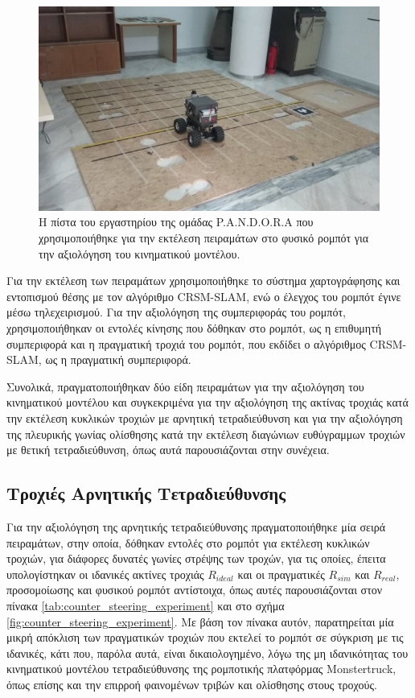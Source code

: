 \begin{figure}[!ht]
	\centering
	\includegraphics[width=\linewidth]{Chapters/Chapter5/Figures/pandora_arena.jpg}
	\caption{Η πίστα του εργαστηρίου της ομάδας P.A.N.D.O.R.A που χρησιμοποιήθηκε για την εκτέλεση πειραμάτων στο φυσικό ρομπότ για την αξιολόγηση του κινηματικού μοντέλου.}
	\label{fig:pandora_circuit}
\end{figure}

\bigskip
Για την εκτέλεση των πειραμάτων χρησιμοποιήθηκε το σύστημα χαρτογράφησης και εντοπισμού θέσης με τον αλγόριθμο CRSM-SLAM, ενώ ο έλεγχος του ρομπότ έγινε μέσω τηλεχειρισμού. Για την αξιολόγηση της συμπεριφοράς του ρομπότ, χρησιμοποιήθηκαν οι εντολές κίνησης που δόθηκαν στο ρομπότ, ως η επιθυμητή συμπεριφορά και η πραγματική τροχιά του ρομπότ, που εκδίδει ο αλγόριθμος CRSM-SLAM, ως η πραγματική συμπεριφορά.

\bigskip
Συνολικά, πραγματοποιήθηκαν δύο είδη πειραμάτων για την αξιολόγηση του κινηματικού μοντέλου και συγκεκριμένα για την αξιολόγηση της ακτίνας τροχιάς κατά την εκτέλεση κυκλικών τροχιών με αρνητική τετραδιεύθυνση και για την αξιολόγηση της πλευρικής γωνίας ολίσθησης κατά την εκτέλεση διαγώνιων ευθύγραμμων τροχιών με θετική τετραδιεύθυνση, όπως αυτά παρουσιάζονται στην συνέχεια.

\subsection{Τροχιές Αρνητικής Τετραδιεύθυνσης}
Για την αξιολόγηση της αρνητικής τετραδιεύθυνσης πραγματοποιήθηκε μία σειρά πειραμάτων, στην οποία, δόθηκαν εντολές στο ρομπότ για εκτέλεση κυκλικών τροχιών, για διάφορες δυνατές γωνίες στρέψης των τροχών, για τις οποίες, έπειτα υπολογίστηκαν οι ιδανικές ακτίνες τροχιάς $R_{ideal}$ και οι πραγματικές $R_{sim}$ και $R_{real}$, προσομοίωσης και φυσικού ρομπότ αντίστοιχα, όπως αυτές παρουσιάζονται στον πίνακα \ref{tab:counter_steering_experiment} και στο σχήμα \ref{fig:counter_steering_experiment}. Με βάση τον πίνακα αυτόν, παρατηρείται μία μικρή απόκλιση των πραγματικών τροχιών που εκτελεί το ρομπότ σε σύγκριση με τις ιδανικές, κάτι που, παρόλα αυτά, είναι δικαιολογημένο, λόγω της μη ιδανικότητας του κινηματικού μοντέλου τετραδιεύθυνσης της ρομποτικής πλατφόρμας Monstertruck, όπως επίσης και την επιρροή φαινομένων τριβών και ολίσθησης στους τροχούς.
 
